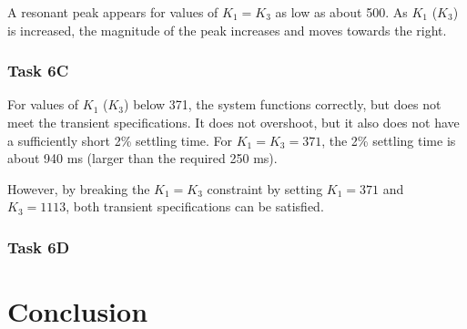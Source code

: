 \documentclass{article}
\begin{document}
A resonant peak appears for values of $K_1 = K_3$ as low as about 500.
As $K_1$ ($K_3$) is increased, the magnitude of the peak increases
and moves towards the right.

\subsubsection*{Task 6C}

For values of $K_1$ ($K_3$) below 371, the system functions correctly,
but does not meet the transient specifications.  It does not
overshoot, but it also does not have a sufficiently short 2\% settling
time.  For $K_1 = K_3 = 371$, the 2\% settling time is about 940 ms
(larger than the required 250 ms).


However, by breaking the $K_1 = K_3$ constraint by setting $K_1 = 371$
and $K_3 = 1113$, both transient specifications can be satisfied.


\subsubsection*{Task 6D}

\section*{Conclusion}
\end{document}
